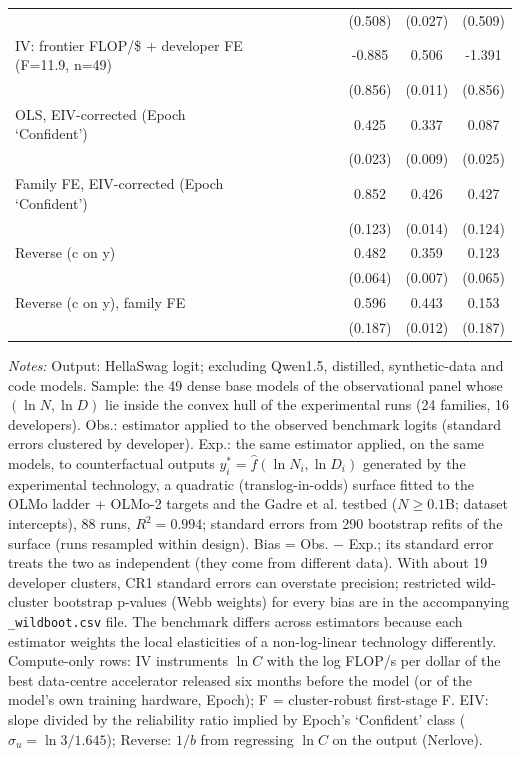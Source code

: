 \begin{table}[!htbp]
\begin{threeparttable}
\begin{tabular}{lccccccccc}
 &  &  &  &  &  &  & (0.508) & (0.027) & (0.509) \\
IV: frontier FLOP/\$ + developer FE (F=11.9, n=49) &  &  &  &  &  &  & -0.885 & 0.506 & -1.391 \\
 &  &  &  &  &  &  & (0.856) & (0.011) & (0.856) \\
OLS, EIV-corrected (Epoch `Confident') &  &  &  &  &  &  & 0.425 & 0.337 & 0.087 \\
 &  &  &  &  &  &  & (0.023) & (0.009) & (0.025) \\
Family FE, EIV-corrected (Epoch `Confident') &  &  &  &  &  &  & 0.852 & 0.426 & 0.427 \\
 &  &  &  &  &  &  & (0.123) & (0.014) & (0.124) \\
Reverse (c on y) &  &  &  &  &  &  & 0.482 & 0.359 & 0.123 \\
 &  &  &  &  &  &  & (0.064) & (0.007) & (0.065) \\
Reverse (c on y), family FE &  &  &  &  &  &  & 0.596 & 0.443 & 0.153 \\
 &  &  &  &  &  &  & (0.187) & (0.012) & (0.187) \\
\bottomrule
\end{tabular}
\begin{tablenotes}[flushleft]
\footnotesize
\item \textit{Notes:} Output: HellaSwag logit; excluding Qwen1.5, distilled, synthetic-data and code models. Sample: the 49 dense base models of the observational panel whose $(\ln N,\ln D)$ lie inside the convex hull of the experimental runs (24 families, 16 developers). Obs.: estimator applied to the observed benchmark logits (standard errors clustered by developer). Exp.: the same estimator applied, on the same models, to counterfactual outputs $y^*_i=\hat f(\ln N_i,\ln D_i)$ generated by the experimental technology, a quadratic (translog-in-odds) surface fitted to the OLMo ladder + OLMo-2 targets and the Gadre et al. testbed ($N\geq0.1$B; dataset intercepts), 88 runs, $R^2=0.994$; standard errors from 290 bootstrap refits of the surface (runs resampled within design). Bias = Obs. $-$ Exp.; its standard error treats the two as independent (they come from different data). With about 19 developer clusters, CR1 standard errors can overstate precision; restricted wild-cluster bootstrap p-values (Webb weights) for every bias are in the accompanying \texttt{\_wildboot.csv} file. The benchmark differs across estimators because each estimator weights the local elasticities of a non-log-linear technology differently. Compute-only rows: IV instruments $\ln C$ with the log FLOP/s per dollar of the best data-centre accelerator released six months before the model (or of the model's own training hardware, Epoch); F = cluster-robust first-stage F. EIV: slope divided by the reliability ratio implied by Epoch's `Confident' class ($\sigma_u=\ln 3/1.645$); Reverse: $1/b$ from regressing $\ln C$ on the output (Nerlove).
\end{tablenotes}
\end{threeparttable}
\end{table}
